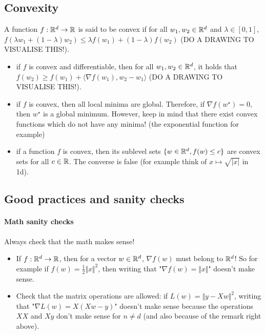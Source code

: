 \subsection{Convexity}

A function $f:\mathbb{R}^d \to \mathbb{R}$ is said to be convex if for all $w_1, w_2 \in \mathbb{R}^d$ and $\lambda \in [0, 1]$, $f(\lambda w_1 + (1 - \lambda) w_2) \leq \lambda f(w_1) + (1 - \lambda) f(w_2)$ (DO A DRAWING TO VISUALISE THIS!). 

\begin{itemize}
    \item if $f$ is convex and differentiable, then for all $w_1, w_2 \in \mathbb{R}^d$, it holds that $f(w_2) \geq f(w_1) + \langle \nabla f(w_1), w_2 - w_1 \rangle$ (DO A DRAWING TO VISUALISE THIS!).
    \item if $f$ is convex, then all local minima are global. Therefore, if $\nabla f(w^\star) = 0$, then $w^\star$ is a global minimum. However, keep in mind that there exist convex functions which do not have any minima! (the exponential function for example)
    \item if a function $f$ is convex, then its sublevel sets $\{ w \in \mathbb{R}^d, f(w) \leq c \}$ are convex sets for all $c \in \mathbb{R}$. The converse is false (for example think of $x \mapsto \sqrt{|x|}$ in 1d).
\end{itemize}

\subsection{Good practices and sanity checks}

\paragraph{Math sanity checks} Always check that the math makes sense! 

\begin{itemize}
    \item  If $f : \mathbb{R}^d \to \mathbb{R}$, then for a vector $w \in \mathbb{R}^d$, $\nabla f(w)$ must belong to $\mathbb{R}^d$! So for example if $f(w) = \frac{1}{2} \Vert x \Vert^2$, then writing that "$\nabla f(w) = \Vert x \Vert$" doesn't make sense. 
    \item Check that the matrix operations are allowed: if $L(w) = \Vert y - X w \Vert^2$, writing that "$\nabla L(w) = X (X w -y)$" doesn't make sense because the operations $X X$ and $X y$ don't make sense for $n \neq d$ (and also because of the remark right above).
\end{itemize}


